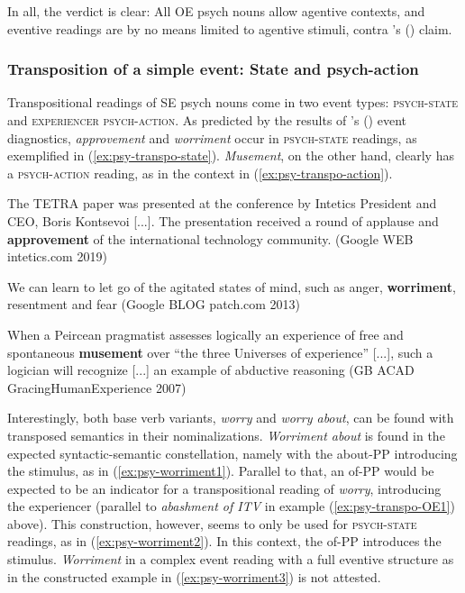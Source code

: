 \noindent In all, the verdict is clear: All OE psych nouns allow agentive contexts, and eventive readings are by no means limited to agentive stimuli, contra \citeauthor{Grimshaw.1990}'s (\citeyear{Grimshaw.1990}) claim.


\subsubsection[Transposition of a simple event]{Transposition of a simple event: State and psych-action}
\label{sec:psy-output-survey-transSE}

Transpositional readings of SE psych nouns come in two event types: \textsc{psych-state} and \textsc{experiencer psych-action}. As predicted by the results of \citeauthor{VanValin.2005}'s (\citeyear{VanValin.2005}) event diagnostics, \textit{approvement} and \textit{worriment} occur in \textsc{psych-state} readings, as exemplified in (\ref{ex:psy-transpo-state}). \textit{Musement}, on the other hand, clearly has a \textsc{psych-action} reading, as in the context in (\ref{ex:psy-transpo-action}). 

\begin{exe}
	\ex \label{ex:psy-transpo-state}
	\begin{xlist}
	\item \label{ex:psy-transpo-state1} The TETRA paper was presented at the conference by Intetics President and CEO, Boris Kontsevoi [...]. The presentation received a round of applause and \textbf{approvement} of the international technology community. {\small(Google WEB intetics.com 2019)}
	\item \label{ex:psy-transpo-state2} We can learn to let go of the agitated states of mind, such as anger, \textbf{worriment}, resentment and fear 
	{\small(Google BLOG patch.com 2013)}
	\end{xlist}
	\ex \label{ex:psy-transpo-action} When a Peircean pragmatist assesses logically an experience of free and spontaneous \textbf{musement} over ``the three Universes of experience'' [...], such a logician  will recognize [...]	an example of abductive reasoning  {\small(\acs{GB} ACAD GracingHumanExperience 2007)}
\end{exe}

\noindent Interestingly, both base verb variants, \textit{worry} and \textit{worry about}, can be found with transposed semantics in their nominalizations. 
\textit{Worriment about} is found in the expected syntactic-semantic constellation, namely with the about-PP introducing the stimulus, as in (\ref{ex:psy-worriment1}).
Parallel to that, an of-PP would be expected to be an indicator for a transpositional reading of \textit{worry}, introducing the experiencer (parallel to \textit{abashment of ITV} in example (\ref{ex:psy-transpo-OE1}) above). This construction, however, seems to only be used for \textsc{psych-state} readings, as in (\ref{ex:psy-worriment2}). In this context, the of-PP introduces the stimulus. \textit{Worriment} in a complex event reading with a full eventive structure as in the constructed example in (\ref{ex:psy-worriment3}) is not attested. 

